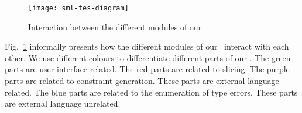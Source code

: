 \documentclass{jfp1}
\newcommand{\myfigure}{figure}
\newcommand{\sizeintablesp}{footnotesize}
\begin{document}
\begin{\myfigure}[t]
  \begin{\sizeintablesp}
    \begin{center}
      \texttt{[image: sml-tes-diagram]}
    \end{center}
    \caption{Interaction between the different modules of our \TES}
    \label{fig:smltesdiagram}
  \end{\sizeintablesp}
\end{\myfigure}

Fig.~\ref{fig:smltesdiagram} informally presents how the different
modules of our \TES\ interact with each other.  We use different
colours to differentiate different parts of our \TES.  The green parts
are user interface related.  The red parts are related to slicing.
The purple parts are related to constraint generation.  These parts
are external language related.  The blue parts are related to the
enumeration of type errors.  These parts are external language
unrelated.
\end{document}
